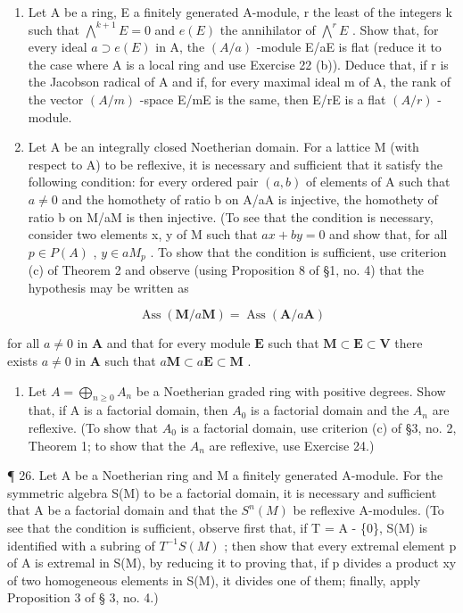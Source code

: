 \begin{enumerate}
\def\labelenumi{\arabic{enumi}.}
\setcounter{enumi}{22}
\item
  Let A be a ring, E a finitely generated A-module, r the least of the integers k such that \(\bigwedge^{k+1}E=0\) and \(e(E)\) the annihilator of \(\bigwedge^{r}E\) . Show that, for every ideal \(a\supset e(E)\) in A, the \((A/a)\) -module E/aE is flat (reduce it to the case where A is a local ring and use Exercise 22 (b)). Deduce that, if r is the Jacobson radical of A and if, for every maximal ideal m of A, the rank of the vector \((A/m)\) -space E/mE is the same, then E/rE is a flat \((A/r)\) -module.
\item
  Let A be an integrally closed Noetherian domain. For a lattice M (with respect to A) to be reflexive, it is necessary and sufficient that it satisfy the following condition: for every ordered pair \((a, b)\) of elements of A such that \(a \neq 0\) and the homothety of ratio b on A/aA is injective, the homothety of ratio b on M/aM is then injective. (To see that the condition is necessary, consider two elements x, y of M such that \(ax + by = 0\) and show that, for all \(p \in P(A)\) , \(y \in aM_{p}\) . To show that the condition is sufficient, use criterion (c) of Theorem 2 and observe (using Proposition 8 of §1, no. 4) that the hypothesis may be written as
\end{enumerate}

\[
\operatorname{Ass} (\mathbf {M} / a \mathbf {M}) = \operatorname{Ass} (\mathbf {A} / a \mathbf {A})
\]

for all \(a \neq 0\) in \(\mathbf{A}\) and that for every module \(\mathbf{E}\) such that \(\mathbf{M} \subset \mathbf{E} \subset \mathbf{V}\) there exists \(a \neq 0\) in \(\mathbf{A}\) such that \(a\mathbf{M} \subset a\mathbf{E} \subset \mathbf{M}\) .

\begin{enumerate}
\def\labelenumi{\arabic{enumi}.}
\setcounter{enumi}{24}
\tightlist
\item
  Let \(A = \bigoplus_{n \geq 0} A_n\) be a Noetherian graded ring with positive degrees. Show that, if A is a factorial domain, then \(A_0\) is a factorial domain and the \(A_n\) are reflexive. (To show that \(A_0\) is a factorial domain, use criterion (c) of §3, no. 2, Theorem 1; to show that the \(A_n\) are reflexive, use Exercise 24.)
\end{enumerate}

¶ 26. Let A be a Noetherian ring and M a finitely generated A-module. For the symmetric algebra S(M) to be a factorial domain, it is necessary and sufficient that A be a factorial domain and that the \(S^{n}(M)\) be reflexive A-modules. (To see that the condition is sufficient, observe first that, if T = A - \{0\}, S(M) is identified with a subring of \(T^{-1}S(M)\) ; then show that every extremal element p of A is extremal in S(M), by reducing it to proving that, if p divides a product xy of two homogeneous elements in S(M), it divides one of them; finally, apply Proposition 3 of § 3, no. 4.)

